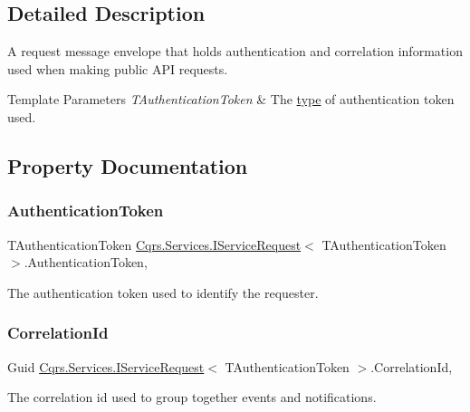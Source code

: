 \subsection{Detailed Description}
A request message envelope that holds authentication and correlation information used when making public A\+PI requests. 


\begin{DoxyTemplParams}{Template Parameters}
{\em T\+Authentication\+Token} & The \hyperlink{}{type} of authentication token used.\\
\hline
\end{DoxyTemplParams}


\subsection{Property Documentation}
\mbox{\label{interfaceCqrs_1_1Services_1_1IServiceRequest_a43350104fd645d2d9b4359716c23fdb4}} 
\subsubsection{\texorpdfstring{Authentication\+Token}{AuthenticationToken}}
{\footnotesize\ttfamily T\+Authentication\+Token \hyperlink{interfaceCqrs_1_1Services_1_1IServiceRequest}{Cqrs.\+Services.\+I\+Service\+Request}$<$ T\+Authentication\+Token $>$.Authentication\+Token\hspace{0.3cm}{\ttfamily [get]}, {\ttfamily [set]}}



The authentication token used to identify the requester. 

\mbox{\label{interfaceCqrs_1_1Services_1_1IServiceRequest_aea1c494a4852fc72d8883fd70bf1aeb9}} 
\subsubsection{\texorpdfstring{Correlation\+Id}{CorrelationId}}
{\footnotesize\ttfamily Guid \hyperlink{interfaceCqrs_1_1Services_1_1IServiceRequest}{Cqrs.\+Services.\+I\+Service\+Request}$<$ T\+Authentication\+Token $>$.Correlation\+Id\hspace{0.3cm}{\ttfamily [get]}, {\ttfamily [set]}}



The correlation id used to group together events and notifications. 

